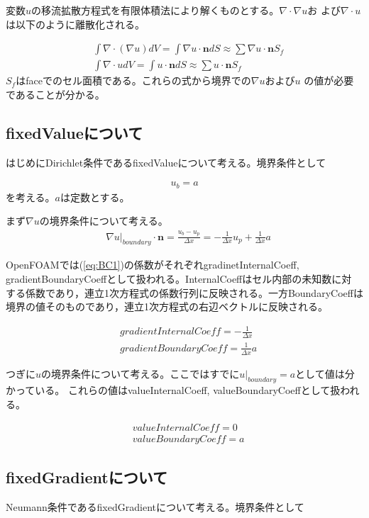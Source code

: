\documentclass[a4paper,fleqn]{jsarticle}
\begin{document}
変数$u$の移流拡散方程式を有限体積法により解くものとする。$\nabla \cdot \nabla u$お
よび$\nabla \cdot u$は以下のように離散化される。

\begin{align}
 & \int \nabla \cdot (\nabla u) dV=\int \nabla u \cdot \bm{n}dS
 \approx \sum \nabla u \cdot \bm{n} S_f \\
 & \int \nabla \cdot u dV=\int u \cdot \bm{n} dS \approx \sum u \cdot
 \bm{n} S_f
\end{align}
$S_f$はfaceでのセル面積である。これらの式から境界での$\nabla u$および$u$
の値が必要であることが分かる。

\subsection{fixedValueについて}
はじめにDirichlet条件であるfixedValueについて考える。境界条件として

\begin{align}
 u_b=a
\end{align}
を考える。$a$は定数とする。

まず$\nabla u$の境界条件について考える。
\begin{align}
 & \nabla u|_{boundary}\cdot \bm{n}=\frac{u_b-u_p}{\Delta x} 
 = -\frac{1}{\Delta x} u_p + \frac{1}{\Delta x} a \label{eq:BC1}
\end{align}

OpenFOAMでは(\ref{eq:BC1})の係数がそれぞれgradinetInternalCoeff,
gradientBoundaryCoeffとして扱われる。InternalCoeffはセル内部の未知数に対
する係数であり，連立1次方程式の係数行列に反映される。一方BoundaryCoeffは
境界の値そのものであり，連立1次方程式の右辺ベクトルに反映される。

\begin{align}
& gradientInternalCoeff=-\frac{1}{\Delta x} \\
& gradientBoundaryCoeff=\frac{1}{\Delta x}a
\end{align}


つぎに$u$の境界条件について考える。ここではすでに$u|_{boundary}=a$として値は分かっている。
これらの値はvalueInternalCoeff, valueBoundaryCoeffとして扱われる。

\begin{align}
& valueInternalCoeff=0 \\
& valueBoundaryCoeff=a 
\end{align}


\subsection{fixedGradientについて}
Neumann条件であるfixedGradientについて考える。境界条件として
\end{document}
